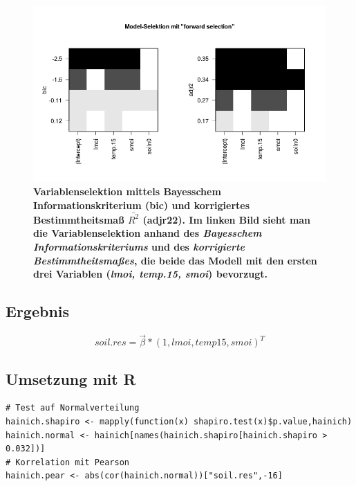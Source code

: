 \begin{figure}[ht]
	\centering
	\includegraphics[width=\textwidth]{fig/model/variablenselektion-bic-adjr2.png}
	\caption{\bf{Variablenselektion mittels Bayesschem Informationskriterium (bic) und korrigiertes Bestimmtheitsmaß $\bar{R^2}$ (adjr22)}. Im linken Bild sieht man die Variablenselektion anhand des \emph{Bayesschem Informationskriteriums} und des \emph{korrigierte Bestimmtheitsmaßes}, die beide das Modell mit den ersten drei Variablen (\emph{lmoi, temp.15, smoi}) bevorzugt.}
    \label{fig:bic}
\end{figure}

\subsection{Ergebnis}

$$soil.res = \vec{\beta} * (1,lmoi,temp15,smoi)^T$$


\subsection{Umsetzung mit R}

\begin{lstlisting}
# Test auf Normalverteilung
hainich.shapiro <- mapply(function(x) shapiro.test(x)$p.value,hainich)
hainich.normal <- hainich[names(hainich.shapiro[hainich.shapiro > 0.032])]
# Korrelation mit Pearson
hainich.pear <- abs(cor(hainich.normal))["soil.res",-16]
\end{lstlisting}
